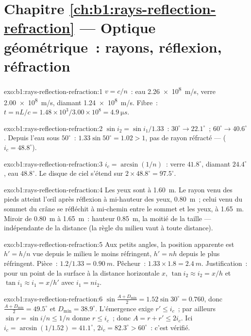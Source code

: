 \section*{Chapitre \ref{ch:b1:rays-reflection-refraction} --- Optique géométrique~: rayons, réflexion, réfraction}

\begin{solution}{exo:b1:rays-reflection-refraction:1}
$v = c/n$~: eau \qty{2.26e8}{m/s}, verre \qty{2.00e8}{m/s}, diamant
\qty{1.24e8}{m/s}. Fibre~: $t = nL/c = 1.48 \times 10^3/3.00\times10^8 =
\qty{4.9}{\micro s}$.
\end{solution}

\begin{solution}{exo:b1:rays-reflection-refraction:2}
$\sin i_2 = \sin i_1/1.33$~: $30^\circ \to 22.1^\circ$~; $60^\circ \to
40.6^\circ$. Depuis l'eau sous $50^\circ$~: $1.33\sin 50^\circ = 1.02 > 1$,
pas de rayon réfracté ---  ($i_c = 48.8^\circ$).
\end{solution}

\begin{solution}{exo:b1:rays-reflection-refraction:3}
$i_c = \arcsin(1/n)$~: verre $41.8^\circ$, diamant $24.4^\circ$, eau
$48.8^\circ$. Le disque de ciel s'étend sur $2 \times 48.8^\circ = 97.5^\circ$.
\end{solution}

\begin{solution}{exo:b1:rays-reflection-refraction:4}
Les yeux sont à \qty{1.60}{m}. Le rayon venu des pieds atteint l'œil
après réflexion à mi-hauteur des yeux, \qty{0.80}{m}~; celui venu du
sommet du crâne se réfléchit à mi-chemin entre le sommet et les yeux, à
\qty{1.65}{m}. Miroir de \qty{0.80}{m} à \qty{1.65}{m}~: hauteur
\qty{0.85}{m}, la moitié de la taille --- indépendante de la distance
(la règle du milieu vaut à toute distance).
\end{solution}

\begin{solution}{exo:b1:rays-reflection-refraction:5}
Aux petits angles, la position apparente est $h' = h/n$ vue depuis le
milieu le moins réfringent, $h' = nh$ depuis le plus réfringent. Pièce~:
$1.2/1.33 =
\qty{0.90}{m}$. Pêcheur~: $1.33 \times 1.8 = \qty{2.4}{m}$. Justification~:
pour un point de la surface à la distance horizontale $x$, $\tan i_2 \approx i_2 =
x/h$ et $\tan i_1 \approx i_1 = x/h'$ avec $i_1 = n i_2$.
\end{solution}

\begin{solution}{exo:b1:rays-reflection-refraction:6}
$\sin\frac{A + D_{\min}}{2} = 1.52\sin 30^\circ = 0.760$, donc
$\frac{A + D_{\min}}{2} = 49.5^\circ$ et $D_{\min} = 38.9^\circ$.
L'émergence exige $r' \leq i_c$~; par ailleurs $\sin r = \sin i/n \leq 1/n$ donne
$r \leq i_c$~; donc $A = r + r' \leq 2i_c$. Ici $i_c = \arcsin(1/1.52) =
41.1^\circ$, $2i_c = 82.3^\circ > 60^\circ$~: c'est vérifié.
\end{solution}

